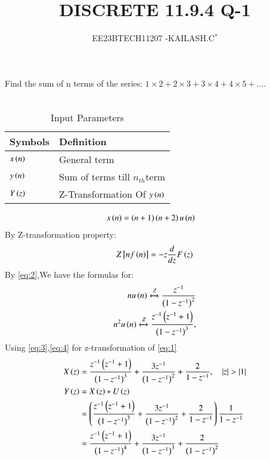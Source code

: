 \documentclass[journal,12pt,twocolumn]{IEEEtran}
\theoremstyle{remark}
\begin{document}

\vspace{3cm}

\title{DISCRETE 11.9.4 Q-1}
\author{EE23BTECH11207 -KAILASH.C$^{*}$%
}
\maketitle
\newpage
\bigskip

\renewcommand{\thefigure}{\theenumi}
\renewcommand{\thetable}{\theenumi}


Find the sum of n terms of the series:
$1\times2+2\times3+3\times4+4\times5+....$\\ \\
\solution
\begin{table}[h]
\begin{tabular}{|l|l|}
\hline
\textbf{Symbols} & \textbf{Definition}\\ \hline
$x\left(n\right)$ & General term \\ \hline
$y\left(n\right)$ & Sum of terms till $n_{th}$term \\ \hline
$Y\left(z\right)$ & Z-Transformation Of $y\left(n\right)$\\ \hline
\end{tabular}
\caption{Input Parameters}
\label{Fig:1}
\end{table}
\begin{align}
 x\left(n\right)&=\left(n+1\right)\left(n+2\right)u\left(n\right)   \label{eq:1}
\end{align}
By Z-transformation property:
\begin{align}
Z{}\left[nf\left(n\right)\right]=-z\frac{d}{dz}F\left(z\right)\label{eq:2}
\end{align}
By \eqref{eq:2},We have the formulas for:
\begin{align}
nu\left(n\right)\xleftrightarrow[]{Z} \frac{z^{-1}}{\left(1-z^{-1}\right)^2}\label{eq:3}\\
n^2u\left(n\right)\xleftrightarrow[]{Z}\frac{z^{-1}\left(z^{-1}+1\right)}{\left(1-z^{-1}\right)^3},\label{eq:4}
\end{align}
Using \eqref{eq:3},\eqref{eq:4} for z-transformation of \eqref{eq:1}
\begin{align}
    X\left(z\right)&=\frac{z^{-1}\left(z^{-1}+1\right)}{\left(1-z^{-1}\right)^3}+\frac{3z^{-1}}{\left(1-z^{-1}\right)^2}+\frac{2}{1-z^{-1}},\quad\left\vert z\right\vert>\left\vert1\right\vert\label{eq:5}\\
    Y\left(z\right)&=X\left(z\right)*U\left(z\right)\label{eq:6}\\
   &=\left(\frac{z^{-1}\left(z^{-1}+1\right)}{\left(1-z^{-1}\right)^3}+\frac{3z^{-1}}{\left(1-z^{-1}\right)^2}+\frac{2}{1-z^{-1}}\right)\frac{1}{1-z^{-1}}\label{eq:7}\\
    &=\frac{z^{-1}\left(z^{-1}+1\right)}{\left(1-z^{-1}\right)^4}+\frac{3z^{-1}}{\left(1-z^{-1}\right)^3}+\frac{2}{\left(1-z^{-1}\right)^2}\label{eq:8}
\end{align}
\end{document}
